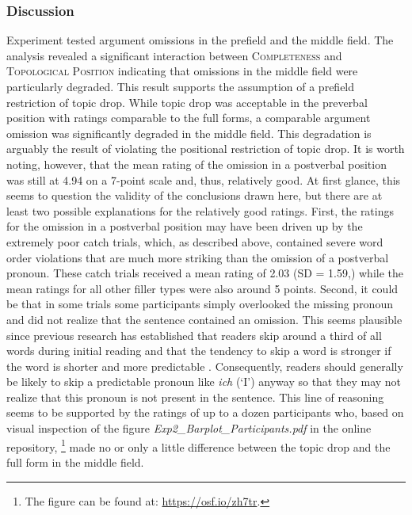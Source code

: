 \subsubsection{Discussion}
Experiment  tested argument omissions in the prefield and the middle field.
The analysis revealed a significant interaction between \textsc{Completeness} and \textsc{Topological Position} indicating that omissions in the middle field were particularly degraded.
This result supports the assumption of a prefield restriction of topic drop.
While topic drop was acceptable in the preverbal position with ratings comparable to the full forms, a comparable argument omission was significantly degraded in the middle field.
This degradation is arguably the result of violating the positional restriction of topic drop.
It is worth noting, however, that the mean rating of the omission in a postverbal position was still at 4.94 on a 7-point scale and, thus, relatively good.
At first glance, this seems to question the validity of the conclusions drawn here, but there are at least two possible explanations for the relatively good ratings.
First, the ratings for the omission in a postverbal position may have been driven up by the extremely poor catch trials, which, as described above, contained severe word order violations that are much more striking than the omission of a postverbal pronoun.
These catch trials received a mean rating of 2.03 (SD = 1.59,) while the mean ratings for all other filler types were also around 5 points.
Second, it could be that in some trials some participants simply overlooked the missing pronoun and did not realize that the sentence contained an omission.
This seems plausible since previous research has established that readers skip around a third of all words during initial reading \citep{rayner1998} and that the tendency to skip a word is stronger if the word is shorter and more predictable  \citep[e.g.,][]{rayner.mcconkie1976,brysbaert.etal2005,rayner.etal2011}.
Consequently, readers should generally be likely to skip a predictable  pronoun like \textit{ich} (`I') anyway so that they may not realize that this pronoun is not present in the sentence.
This line of reasoning seems to be supported by the ratings of up to a dozen participants who, based on visual inspection of the figure \mbox{\textit{Exp2\_Barplot\_Participants.pdf}} 
in the online repository,%
\footnote{The figure can be found at: \url{https://osf.io/zh7tr}.}
%
made no or only a little difference between the topic drop and the full form in the middle field.%
